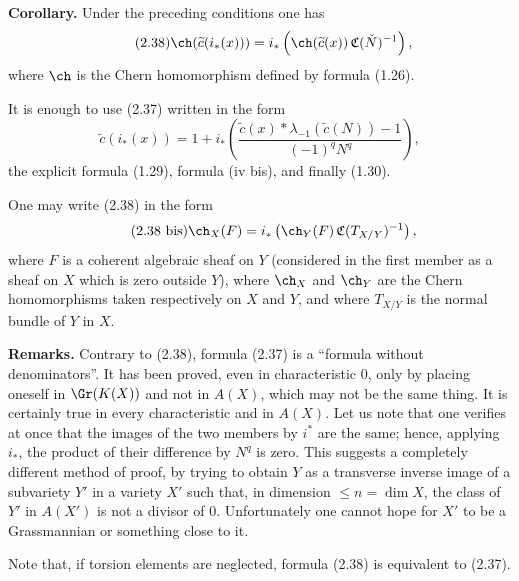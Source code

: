 \textbf{Corollary.} Under the preceding conditions one has
\begin{equation}\tag{2.38}
 \ch(\widetilde c(i_*(x)))=i_*\left(\ch(\widetilde c(x))\,\mathfrak C(\check N)^{-1}\right),
\end{equation}
where $\ch$ is the Chern homomorphism defined by formula (1.26).

It is enough to use (2.37) written in the form
\begin{equation}\tag{2.37 bis}
 \widetilde c(i_*(x))=1+i_*\left(\frac{\widetilde c(x)*\lambda_{-1}(\widetilde c(N))-1}{(-1)^qN^q}\right),
\end{equation}
the explicit formula (1.29), formula (iv bis), and finally (1.30).

One may write (2.38) in the form
\begin{equation}\tag{2.38 bis}
 \ch_X(F)=i_*\left(\ch_Y(F)\,\mathfrak C(T_{X/Y})^{-1}\right),
\end{equation}
where $F$ is a coherent algebraic sheaf on $Y$ (considered in the first member as a sheaf on $X$ which is zero outside $Y$), where $\ch_X$ and $\ch_Y$ are the Chern homomorphisms taken respectively on $X$ and $Y$, and where $T_{X/Y}$ is the normal bundle of $Y$ in $X$.

\textbf{Remarks.} Contrary to (2.38), formula (2.37) is a ``formula without denominators''. It has been proved, even in characteristic $0$, only by placing oneself in $\Gr(K(X))$ and not in $A(X)$, which may not be the same thing. It is certainly true in every characteristic and in $A(X)$. Let us note that one verifies at once that the images of the two members by $i^*$ are the same; hence, applying $i_*$, the product of their difference by $N^q$ is zero. This suggests a completely different method of proof, by trying to obtain $Y$ as a transverse inverse image of a subvariety $Y'$ in a variety $X'$ such that, in dimension $\leq n=\dim X$, the class of $Y'$ in $A(X')$ is not a divisor of $0$. Unfortunately one cannot hope for $X'$ to be a Grassmannian or something close to it.

Note that, if torsion elements are neglected, formula (2.38) is equivalent to (2.37).




\providecommand{\cS}{\mathcal S}
\providecommand{\cD}{\mathcal D}
\providecommand{\cE}{\mathscr E}
\providecommand{\cG}{\mathscr G}
\providecommand{\cL}{\mathscr L}
\providecommand{\cM}{\mathscr M}
\providecommand{\cP}{\mathscr P}
\providecommand{\cK}{\mathcal K}
\providecommand{\Db}{\mathrm D}
\providecommand{\Kb}{\mathrm K}
\providecommand{\Trc}{\operatorname{Tr}}
\providecommand{\ob}{\operatorname{ob}}
\providecommand{\Coh}{\operatorname{Coh}}
\providecommand{\Cone}{\operatorname{Cone}}
\providecommand{\im}{\operatorname{Im}}
\providecommand{\Id}{\operatorname{Id}}
\providecommand{\RR}{\mathrm{R.R.}}
\providecommand{\RRR}{\mathrm{R.R.R.}}
\providecommand{\GrR}{\mathrm{G}}
\providecommand{\pr}{\operatorname{pr}}


